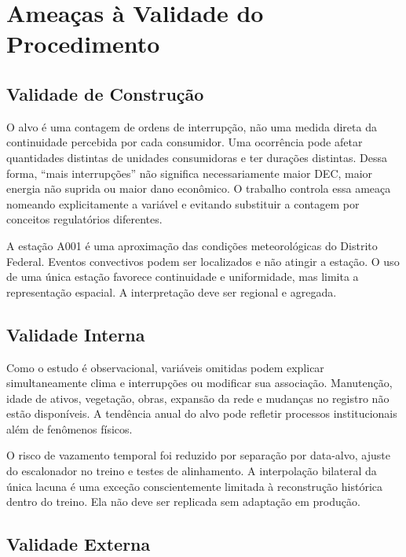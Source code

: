 

\section{Ameaças à Validade do Procedimento}\label{sec:ameacas_validade_metodo}

\subsection{Validade de Construção}

O alvo é uma contagem de ordens de interrupção, não uma medida direta da continuidade percebida por cada consumidor. Uma ocorrência pode afetar quantidades distintas de unidades consumidoras e ter durações distintas. Dessa forma, ``mais interrupções'' não significa necessariamente maior DEC, maior energia não suprida ou maior dano econômico. O trabalho controla essa ameaça nomeando explicitamente a variável e evitando substituir a contagem por conceitos regulatórios diferentes.

A estação A001 é uma aproximação das condições meteorológicas do Distrito Federal. Eventos convectivos podem ser localizados e não atingir a estação. O uso de uma única estação favorece continuidade e uniformidade, mas limita a representação espacial. A interpretação deve ser regional e agregada.

\subsection{Validade Interna}

Como o estudo é observacional, variáveis omitidas podem explicar simultaneamente clima e interrupções ou modificar sua associação. Manutenção, idade de ativos, vegetação, obras, expansão da rede e mudanças no registro não estão disponíveis. A tendência anual do alvo pode refletir processos institucionais além de fenômenos físicos.

O risco de vazamento temporal foi reduzido por separação por data-alvo, ajuste do escalonador no treino e testes de alinhamento. A interpolação bilateral da única lacuna é uma exceção conscientemente limitada à reconstrução histórica dentro do treino. Ela não deve ser replicada sem adaptação em produção.

\subsection{Validade Externa}

